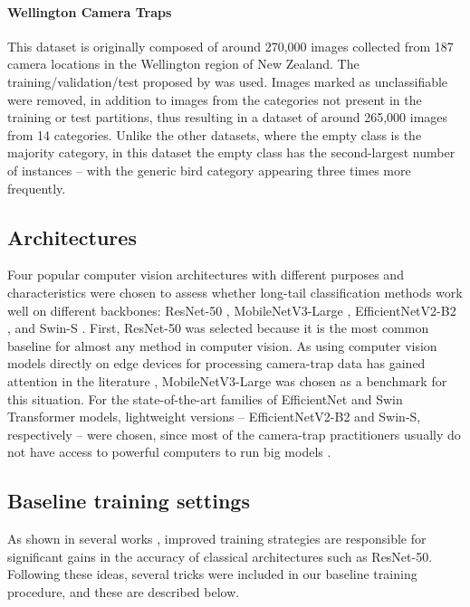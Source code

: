 \paragraph{\textbf{Wellington Camera Traps}~\citep{anton2018}} This dataset is
originally composed of around 270,000 images collected from 187 camera locations
in the Wellington region of New Zealand. The training/validation/test proposed
by \citet{shashidhara2020sequence} was used. Images marked as unclassifiable
were removed, in addition to images from the categories not present in the
training or test partitions, thus resulting in a dataset of around 265,000
images from 14 categories. Unlike the other datasets, where the empty class is 
the majority category, in this dataset the empty class has the second-largest 
number of instances -- with the generic bird category appearing three times more 
frequently.

\subsection{Architectures}

Four popular computer vision architectures with different purposes and
characteristics were chosen to assess whether long-tail classification methods
work well on different backbones: ResNet-50 \citep{he2016deep},
MobileNetV3-Large \citep{howard2019searching},
EfficientNetV2-B2 \citep{tan2021efficientnetv2}, and Swin-S
\citep{liu2021swin}.
First, ResNet-50 was selected because it is the most common baseline for almost
any method in computer vision. As using computer vision models directly on edge
devices for processing camera-trap data has gained attention in the literature
\citep{elias2017s, zualkernan2020towards, Cunha2021, zualkernan2022iot},
MobileNetV3-Large was chosen as a benchmark for this situation. For the
state-of-the-art families of EfficientNet \citep{tan2019efficientnet} and Swin
Transformer \citep{liu2021swin} models, lightweight versions --
EfficientNetV2-B2 and Swin-S, respectively -- were chosen, since most of the
camera-trap practitioners usually do not have access to powerful computers to
run big models \citep{schneider2020three}.

\subsection{Baseline training settings}\label{sec:baseline_settins}

As shown in several works \citep{he2019bag, bello2021revisiting, wightman2021resnet},
improved training strategies are responsible for significant gains in the
accuracy of classical architectures such as ResNet-50. Following these ideas,
several tricks were included in our baseline training procedure, and these are
described below.

